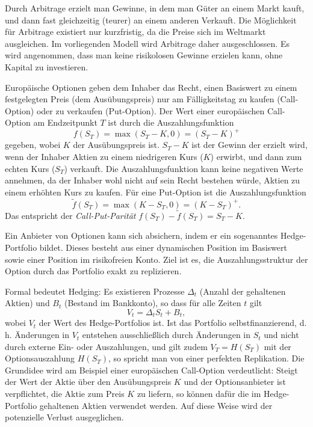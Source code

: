 \begin{defi}
Durch Arbitrage erzielt man Gewinne, in dem man Güter an einem Markt kauft, und dann fast gleichzeitig (teurer) an einem anderen Verkauft.
Die Möglichkeit für Arbitrage existiert nur kurzfristig, da die Preise sich im Weltmarkt ausgleichen. Im vorliegenden Modell wird Arbitrage daher ausgeschlossen.  
Es wird angenommen, dass man keine risikolosen Gewinne erzielen kann, ohne Kapital zu investieren.
\end{defi}

\begin{defi}
    Europäische Optionen geben dem Inhaber das Recht, 
    einen Basiswert zu einem festgelegten Preis (dem Ausübungspreis) nur am 
    Fälligkeitstag zu kaufen (Call-Option) oder zu verkaufen (Put-Option).
    Der Wert einer europäischen Call-Option am Endzeitpunkt $T$ ist durch die Auszahlungsfunktion
    $$f(S_T) = \max(S_T - K, 0) = (S_T - K)^+$$
    gegeben, wobei $K$ der Ausübungspreis ist. $S_T - K$ ist der Gewinn der erzielt wird, wenn der Inhaber
    Aktien zu einem niedrigeren Kurs ($K$) erwirbt, und dann zum echten Kurs ($S_T$) verkauft.
    Die Auszahlungsfunktion kann keine negativen Werte annehmen, da der Inhaber wohl nicht auf sein Recht bestehen würde, 
    Aktien zu einem erhöhten Kurs zu kaufen. Für eine Put-Option ist die Auszahlungsfunktion
    $$\tilde f(S_T) = \max(K - S_T, 0) = (K - S_T)^+.$$
Das entspricht der \textit{Call-Put-Parität}
    $f(S_T) - \tilde f(S_T) = S_T - K$.
\end{defi}

\begin{defi}[Hedging]
Ein Anbieter von Optionen kann sich absichern, indem er ein sogenanntes 
Hedge-Portfolio bildet. Dieses besteht aus einer dynamischen Position 
im Basiswert sowie einer Position im risikofreien Konto. Ziel ist es, die 
Auszahlungsstruktur der Option durch das Portfolio exakt zu replizieren.  

Formal bedeutet Hedging: Es existieren Prozesse $\Delta_t$ (Anzahl der 
gehaltenen Aktien) und $B_t$ (Bestand im Bankkonto), so dass für alle Zeiten $t$ gilt
\[
V_t = \Delta_t S_t + B_t,
\]
wobei $V_t$ der Wert des Hedge-Portfolios ist. Ist das Portfolio 
selbstfinanzierend, d. h. Änderungen in $V_t$ entstehen ausschließlich 
durch Änderungen in $S_t$ und nicht durch externe Ein- oder Auszahlungen, 
und gilt zudem $V_T = H(S_T)$ mit der Optionsauszahlung $H(S_T)$, 
so spricht man von einer perfekten Replikation. Die Grundidee wird am Beispiel einer europäischen Call-Option verdeutlicht: Steigt der Wert der Aktie über den Ausübungspreis $K$ und der Optionsanbieter ist verpflichtet, die Aktie zum Preis $K$ zu liefern, so können dafür die im Hedge-Portfolio gehaltenen Aktien verwendet werden. Auf diese Weise wird der potenzielle Verlust ausgeglichen.
\end{defi}


